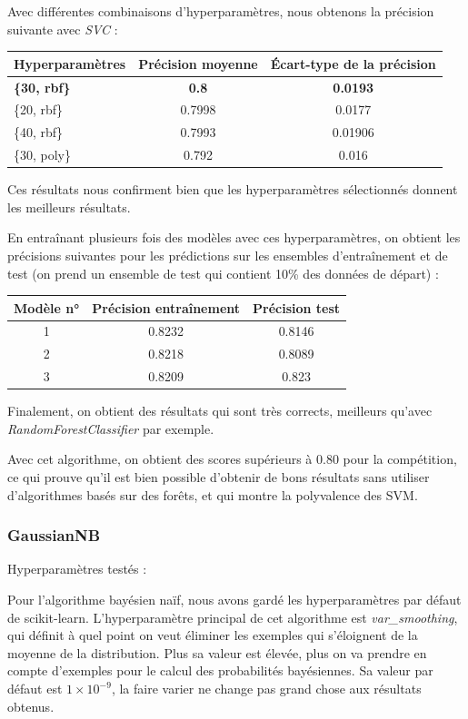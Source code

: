 \documentclass[a4paper]{article}
\begin{document}
    Avec différentes combinaisons d'hyperparamètres, nous obtenons la précision suivante avec {\it SVC} :

    \begin{tabular}{| l | *{2}{c|}}
        \hline
        Hyperparamètres & Précision moyenne & Écart-type de la précision
        \tabularnewline
        \hline
        \textbf{\{30, rbf\}} & \textbf{0.8} & \textbf{0.0193} 
        \tabularnewline
        \hline
        \{20, rbf\} & 0.7998 & 0.0177
        \tabularnewline
        \hline
        \{40, rbf\} & 0.7993 & 0.01906
        \tabularnewline
        \hline
        \{30, poly\} & 0.792 & 0.016
        \tabularnewline
        \hline
    \end{tabular}

    Ces résultats nous confirment bien que les hyperparamètres sélectionnés donnent les meilleurs résultats.

    En entraînant plusieurs fois des modèles avec ces hyperparamètres, on obtient les précisions suivantes pour les prédictions 
    sur les ensembles d'entraînement et de test (on prend un ensemble de test qui contient 10\% des données de départ) :

    \begin{tabular}{| *{3}{c|}}
        \hline
        Modèle n° & Précision entraînement & Précision test
        \tabularnewline
        \hline
        1 & 0.8232 & 0.8146
        \tabularnewline
        \hline
        2 & 0.8218 & 0.8089
        \tabularnewline
        \hline
        3 & 0.8209 & 0.823
        \tabularnewline
        \hline
    \end{tabular}

    Finalement, on obtient des résultats qui sont très corrects, meilleurs qu'avec {\it RandomForestClassifier} par exemple.

    Avec cet algorithme, on obtient des scores supérieurs à 0.80 pour la compétition,
    ce qui prouve qu'il est bien possible d'obtenir de bons résultats sans utiliser d'algorithmes basés sur des
    forêts, et qui montre la polyvalence des SVM.

    \subsubsection{GaussianNB}

    Hyperparamètres testés :

    Pour l'algorithme bayésien naïf, nous avons gardé les hyperparamètres par défaut de scikit-learn.
    L'hyperparamètre principal de cet algorithme est {\it var\_smoothing}, qui définit à quel point
    on veut éliminer les exemples qui s'éloignent de la moyenne de la distribution. Plus sa valeur est
    élevée, plus on va prendre en compte d'exemples pour le calcul des probabilités bayésiennes.
    Sa valeur par défaut est $1\times10^{-9}$, la faire varier ne change pas grand chose aux résultats obtenus.
\end{document}

